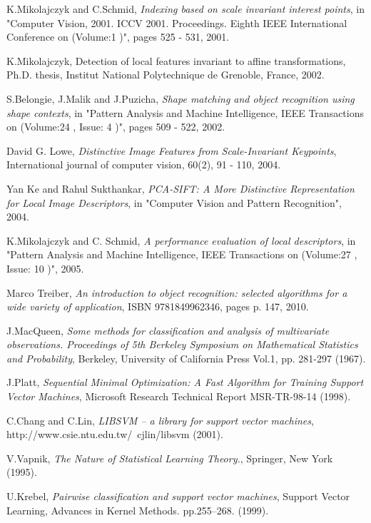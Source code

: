 \begin{thebibliography}{99}
 K.Mikolajczyk and C.Schmid, \emph{Indexing based on scale invariant interest points}, in "Computer Vision, 2001. ICCV 2001. Proceedings. Eighth IEEE International Conference on  (Volume:1 )", pages 525 - 531, 2001.

 K.Mikolajczyk, Detection of local features invariant to affine transformations, Ph.D. thesis, Institut National Polytechnique de Grenoble, France, 2002.

 S.Belongie, J.Malik and J.Puzicha, \emph{Shape matching and object recognition using shape contexts}, in "Pattern Analysis and Machine Intelligence, IEEE Transactions on  (Volume:24 ,  Issue: 4 )", pages 509 - 522, 2002.

 David G. Lowe, \emph{Distinctive Image Features from Scale-Invariant Keypoints}, International journal of computer vision, 60(2), 91 - 110, 2004.

 Yan Ke and Rahul Sukthankar, \emph{PCA-SIFT: A More Distinctive Representation for Local Image Descriptors}, in "Computer Vision and Pattern Recognition", 2004.

 K.Mikolajczyk and C.	Schmid, \emph{A performance evaluation of local descriptors}, in "Pattern Analysis and Machine Intelligence, IEEE Transactions on  (Volume:27 ,  Issue: 10 )", 2005.

 Marco Treiber, \emph{An introduction to object recognition: selected algorithms for a wide variety of application}, ISBN 9781849962346, pages p. 147, 2010.

 J.MacQueen, \emph{Some methods for classification and analysis of multivariate observations. Proceedings of 5th Berkeley Symposium on Mathematical Statistics and Probability}, Berkeley, University of California Press Vol.1, pp. 281-297 (1967).

 J.Platt, \emph{Sequential Minimal Optimization: A Fast Algorithm for Training Support Vector Machines}, Microsoft Research Technical Report MSR-TR-98-14 (1998).

 C.Chang and C.Lin, \emph{LIBSVM – a library for support vector machines}, http://www.csie.ntu.edu.tw/~cjlin/libsvm (2001).


 V.Vapnik, \emph{The Nature of Statistical Learning Theory.}, Springer, New York (1995).

 U.Krebel, \emph{Pairwise classification and support vector machines}, Support Vector Learning, Advances in Kernel Methods. pp.255–268. (1999).


\end{thebibliography}
